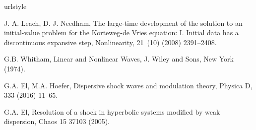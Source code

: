 \documentclass[times]{article}
\begin{document}
\begin{thebibliography}{16}
	\providecommand{\natexlab}[1]{#1}
	\providecommand{\url}[1]{\texttt{#1}}
	\providecommand{\urlprefix}{URL }
	\expandafter\ifx\csname urlstyle\endcsname\relax
	\providecommand{\doi}[1]{doi:\discretionary{}{}{}#1}\else
	\providecommand{\doi}[1]{doi:\discretionary{}{}{}\begingroup
		\urlstyle{rm}\url{#1}\endgroup}\fi
	\providecommand{\bibinfo}[2]{#2}
	
	
	\bibinfo{author}{J. A. Leach}, \bibinfo{author}{D. J. Needham}, \bibinfo{title}{The large-time development of the solution to an initial-value problem for the Korteweg-de Vries equation: I. Initial data has a discontinuous expansive step}, \bibinfo{journal}{Nonlinearity},
	\bibinfo{volume}{21}~(\bibinfo{number}{10}) (\bibinfo{year}{2008})
	\bibinfo{pages}{2391--2408}.
	
	\bibinfo{author}{G.B. Whitham}, \bibinfo{title}{Linear and Nonlinear Waves}, \bibinfo{publisher}{J. Wiley and Sons}, \bibinfo{location}{New York}
	(\bibinfo{year}{1974}).

	\bibinfo{author}{G.A. El}, \bibinfo{author}{M.A. Hoefer}, \bibinfo{title}{Dispersive shock waves and modulation theory}, \bibinfo{journal}{Physica D},
	\bibinfo{volume}{333} (\bibinfo{year}{2016})
	\bibinfo{pages}{11--65}.	

	\bibinfo{author}{G.A. El}, \bibinfo{title}{Resolution of a shock in hyperbolic systems modified by weak dispersion}, \bibinfo{journal}{Chaos}
	\bibinfo{volume}{15} \bibinfo{pages}{37103} (\bibinfo{year}{2005}).	
	
\end{thebibliography}
\end{document}
